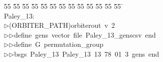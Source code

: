 %
%
\begin{tabbing}
55 \= 55 \= 55 \= 55 \= 55 \= 55 \= 55 \= 55 \= 55 \= 55 \= 55 \= 55 \= 55 \= \kill
\\[0pt]
Paley\_13:\\[0pt]
$\triangleright$\>(ORBITER\_PATH)orbiterout\ v\ 2\ \\[0pt]
$\triangleright$\>$\triangleright$\>define\ gens\ vector\ file\ Paley\_13\_genscsv\ end\ \\[0pt]
$\triangleright$\>$\triangleright$\>define\ G\ permutation\_group\ \\[0pt]
$\triangleright$\>$\triangleright$\>bsgs\ Paley\_13\ Paley\_13\ 13\ 78\ 01\ 3\ gens\ end\ \\[0pt]
\end{tabbing}
